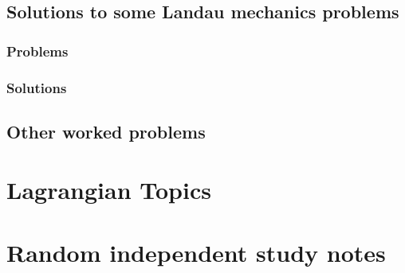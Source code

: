    \chapter{Solutions to some Landau mechanics problems}
      \section{Problems}
         
      \section{Solutions}
         \shipoutAnswer
   \chapter{Other worked problems}
      
         \shipoutAnswer

\part{Lagrangian Topics}
   
   
   
   
   
   

\part{Random independent study notes}
   
   
   
   
   
   
   
   
   
   
   
   
   

